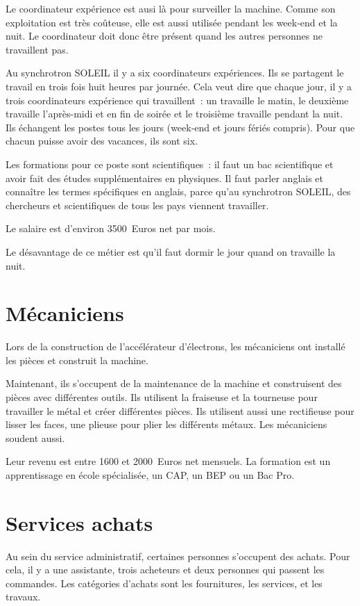 			Le coordinateur expérience est ausi là pour surveiller la machine. Comme son exploitation est très coûteuse, elle est aussi utilisée  pendant les week-end et la nuit. Le coordinateur doit donc être présent quand les autres personnes ne travaillent pas.
			
			Au synchrotron SOLEIL il y a six coordinateurs expériences. Ils se partagent le travail en trois fois huit heures par journée. Cela veut dire que chaque jour, il y a trois coordinateurs expérience qui travaillent~: un travaille le matin, le deuxième travaille l'après-midi et en fin de soirée et le troisième travaille pendant la nuit. Ils échangent les postes tous les jours (week-end et jours fériés compris). Pour que chacun puisse avoir des vacances, ils sont six.
			
			Les formations pour ce poste sont scientifiques~: il faut un bac scientifique et avoir fait des études supplémentaires en physiques. Il faut parler anglais et connaître les termes spécifiques en anglais, parce qu'au synchrotron SOLEIL, des chercheurs et scientifiques de tous les pays viennent travailler.
			
			Le salaire est d'environ 3500~Euros net par mois.

			Le désavantage de ce métier est qu'il faut dormir le jour quand on travaille la nuit. 
		
		\section{Mécaniciens}
			\par Lors de la construction de l'accélérateur d'électrons, les mécaniciens ont installé les pièces et construit la machine. 
			
			\par Maintenant, ils s'occupent de la maintenance de la machine et construisent des pièces avec différentes outils. Ils utilisent la fraiseuse et la tourneuse pour travailler le métal et créer différentes pièces. Ils utilisent aussi une rectifieuse pour lisser les faces, une plieuse pour plier les différents métaux. Les mécaniciens soudent aussi.
			
			\par Leur revenu est entre 1600 et 2000~Euros net mensuels. La formation est un apprentissage en école spécialisée, un CAP, un BEP ou un Bac Pro.
		
		\section{Services achats}
			Au sein du service administratif, certaines personnes s'occupent des achats. Pour cela, il y a une assistante, trois acheteurs et deux personnes qui passent les commandes. Les catégories d'achats sont les fournitures, les services, et les travaux.
		
